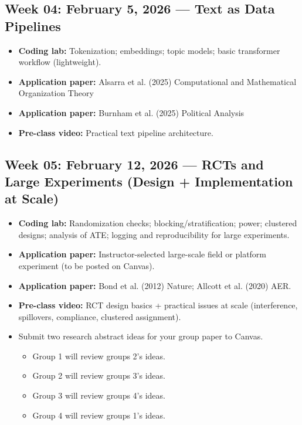 \documentclass[letterpaper,11pt]{article}
\newcommand{\compresslist}{
\setlength{\itemsep}{1pt}
\setlength{\parskip}{0pt}
\setlength{\parsep}{0pt}
}
\begin{document}
\subsection*{Week 04: February 5, 2026 --- Text as Data Pipelines}
\begin{itemize}\compresslist
\item \textbf{Coding lab:} Tokenization; embeddings; topic models; basic transformer workflow (lightweight).
\item \textbf{Application paper:} Alsarra et al. (2025) Computational and Mathematical Organization Theory
\item \textbf{Application paper:} Burnham et al. (2025) Political Analysis
\item \textbf{Pre-class video:} Practical text pipeline architecture.
\end{itemize}


\subsection*{Week 05: February 12, 2026 --- RCTs and Large Experiments (Design + Implementation at Scale)}
\begin{itemize}\compresslist
\item \textbf{Coding lab:} Randomization checks; blocking/stratification; power; clustered designs; analysis of ATE; logging and reproducibility for large experiments.
\item \textbf{Application paper:} Instructor-selected large-scale field or platform experiment (to be posted on Canvas).
\item \textbf{Application paper:} Bond et al. (2012) Nature; Allcott et al. (2020) AER.
\item \textbf{Pre-class video:} RCT design basics + practical issues at scale (interference, spillovers, compliance, clustered assignment).
\item Submit two research abstract ideas for your group paper to Canvas. 
\begin{itemize}
\item Group 1 will review groups 2's ideas.
\item Group 2 will review groups 3's ideas.
\item Group 3 will review groups 4's ideas.
\item Group 4 will review groups 1's ideas.
\end{itemize}
\end{itemize}
\end{document}
